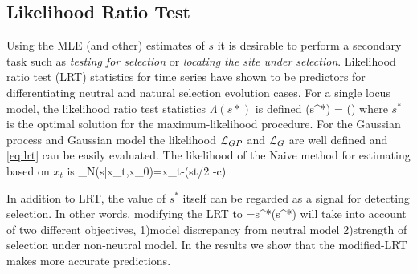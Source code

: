 \subsection{Likelihood Ratio Test}
Using the MLE (and other) estimates of $s$ it is desirable to perform a secondary task such as \emph{testing for selection} or \emph{locating the site under selection}. Likelihood ratio test (LRT) statistics for time series \cite{feder2014} have shown to be predictors for differentiating neutral and natural selection evolution cases. For a single locus model, the likelihood ratio test statistics $\Lambda(s*)$ is defined
\beq \label{eq:lrt}
\Lambda(s^*) = \log \left(\right)
\eeq
where $s^*$ is the optimal solution for the maximum-likelihood procedure. For the Gaussian process and Gaussian model the likelihood ${\cal L}_{GP}$ and ${\cal L}_G$ are well defined and \eqref{eq:lrt} can be easily evaluated. The likelihood of the Naive method for estimating based on $x_t$ is 
\beq
\Lc_N(s|x_t,x_0)=x_t-\sigma(st/2 -c)
\eeq

In addition to LRT, the value of $s^*$ itself can be regarded as a signal for detecting selection. In other words, modifying the LRT to
\beq
\Theta=s^*\Lambda(s^*)
\eeq
will take into account of two different objectives, 1)model discrepancy from neutral model 2)strength of selection under non-neutral model. In the  results we show that the modified-LRT makes more accurate predictions.
\newpage
